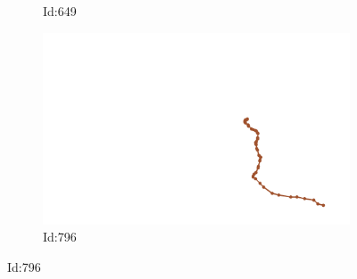 \documentclass[12pt,twoside]{report}
\begin{document}
\begin{figure}
\begin{subfigure}[b]{0.20\textwidth}
\caption{Id:649}
\end{subfigure}
\begin{subfigure}[b]{0.20\textwidth}
\centering
\includegraphics[width=\textwidth]{../../trajectories/796.png}
\caption{Id:796}
\end{subfigure}
\end{figure}
\end{document}
